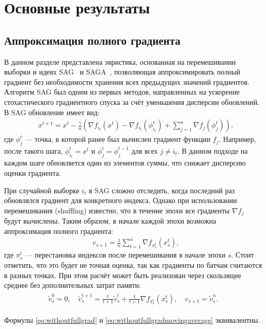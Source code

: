 \section{Основные результаты}\label{sec:main}

\subsection{Аппроксимация полного градиента}\label{subsection:gradientapprox}

В данном разделе представлена эвристика, основанная на перемешивании выборки и идеях \textsc{SAG}~\cite{schmidt2017minimizing} и \textsc{SAGA}~\cite{defazio2014saga}, позволяющая аппроксимировать полный градиент без необходимости хранения всех предыдущих значений градиентов. Алгоритм \textsc{SAG} был одним из первых методов, направленных на ускорение стохастического градиентного спуска за счёт уменьшения дисперсии обновлений. В \textsc{SAG} обновление имеет вид:
\begin{align}\label{eq:sag}
    &\textstyle{x^{t+1} = x^t - \frac{\gamma}{n} \left( \nabla f_{i_t}(x^t) - \nabla f_{i_t}(\phi_{i_t}^t) +  \sum\limits_{j=1}^n \nabla f_j(\phi_j^t) \right),}
\end{align}
где \(\phi_j^t\) — точка, в которой ранее был вычислен градиент функции \(f_j\). Например, после такого шага, \(\phi_{i_t}^t = x^t\) и \(\phi_j^t = \phi_j^{t-1}\) для всех \(j \neq i_t\). В данном подходе на каждом шаге обновляется один из элементов суммы, что снижает дисперсию оценки градиента.

При случайной выборке \(i_t\) в \textsc{SAG} сложно отследить, когда последний раз обновлялся градиент для конкретного индекса. Однако при использовании перемешивания (shuffling) известно, что в течение эпохи все градиенты \(\nabla f_j\) будут вычислены. Таким образом, в начале каждой эпохи возможна аппроксимация полного градиента:
\begin{align} \label{eq:withoutfullgrad}
    &\textstyle{v_{s+1} = \frac{1}{n} \sum\limits_{t=1}^n \nabla f_{\pi_s^t}(x_s^t),}
\end{align}
где \(\pi_s^t\) — перестановка индексов после перемешивания в начале эпохи \(s\). Стоит отметить, что это будет не точная оценка, так как градиенты по батчам считаются в разных точках. При этом расчёт может быть реализован через скользящее среднее без дополнительных затрат памяти:
\begin{align}
\label{eq:withoutfullgradmovingaverage}
\begin{split}
    \textstyle{\widetilde{v}_s^{0}} = 0, \quad \textstyle{\widetilde{v}_s^{t+1}} = \textstyle{\frac{t}{t+1} \widetilde{v}_s^{t} + \frac{1}{t+1} \nabla f_{\pi_s^t}(x_s^t), \quad v_{s+1} = \widetilde{v}_s^n.}
\end{split}
\end{align}
\begin{lemma}\label{lemma:movingaverage}
    Формулы \eqref{eq:withoutfullgrad} и \eqref{eq:withoutfullgradmovingaverage} эквивалентны.
\end{lemma}

